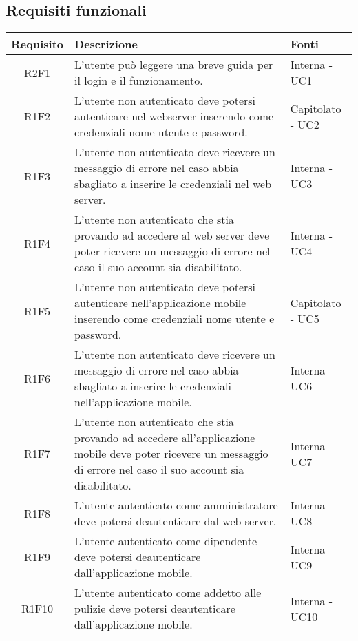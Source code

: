 \subsection{Requisiti funzionali}
\begin{center}
	\begin{longtable}{|c|p{10cm}|p{4cm}|}
		\hline
		\rowcolor{lighter-grayer}
		\textbf{Requisito} & \textbf{Descrizione} & \textbf{Fonti}  \\
		\hline
		\endhead
		
		
		R2F1 & L'utente può leggere una breve guida per il login e il funzionamento. & Interna - UC1 \\
		\hline
		R1F2	&	L'utente non autenticato deve potersi autenticare nel webserver inserendo come credenziali nome utente e password. & Capitolato - UC2	\\
		\hline
		R1F3	&	L'utente non autenticato deve ricevere un messaggio di errore nel caso abbia sbagliato a inserire le credenziali nel web server.& Interna - UC3	\\
		\hline
		R1F4	&	L'utente non autenticato che stia provando ad accedere al web server deve poter ricevere un messaggio di errore nel caso il suo account sia disabilitato.& Interna - UC4	\\
		\hline
		R1F5	&	L'utente non autenticato deve potersi autenticare nell'applicazione mobile inserendo come credenziali nome utente e password. & Capitolato - UC5	\\
		\hline
		R1F6	&	L'utente non autenticato deve ricevere un messaggio di errore nel caso abbia sbagliato a inserire le credenziali nell'applicazione mobile.& Interna - UC6	\\
		\hline
		R1F7	&	L'utente non autenticato che stia provando ad accedere all'applicazione mobile deve poter ricevere un messaggio di errore nel caso il suo account sia disabilitato.& Interna - UC7	\\
		\hline
		R1F8	&	L'utente autenticato come amministratore deve potersi deautenticare dal web server.& Interna - UC8	\\
		\hline
		R1F9	&	L'utente autenticato come dipendente deve potersi deautenticare dall'applicazione mobile.& Interna - UC9	\\
		\hline
		R1F10	&	L'utente autenticato come addetto alle pulizie deve potersi deautenticare dall'applicazione mobile.& Interna - UC10	\\

\end{longtable}
\end{center}
